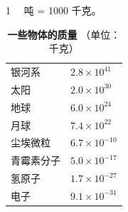 \centerline{1 　吨 = 1000 千克。}

\begin{table}[H]
    \centering
    \caption*{\textbf{一些物体的质量} （单位：千克）}
    \begin{tabular}{w{l}{10em}w{r}{8em}}
        银河系      & $2.8 \times 10^{41}$ \\
        太阳        & $2.0 \times 10^{30}$ \\
        地球        & $6.0 \times 10^{24}$ \\
        月球        & $7.4 \times 10^{22}$ \\
        尘埃微粒    & $6.7 \times 10^{-10}$ \\
        青霉素分子  & $5.0 \times 10^{-17}$ \\
        氢原子      & $1.7 \times 10^{-27}$ \\
        电子        & $9.1 \times 10^{-31}$ \\
    \end{tabular}
\end{table}

\,
